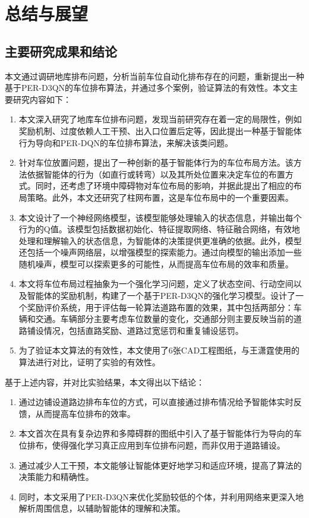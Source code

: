 \section{总结与展望}
\subsection{主要研究成果和结论}
本文通过调研地库排布问题，分析当前车位自动化排布存在的问题，重新提出一种基于PER-D3QN的车位排布算法，并通过多个案例，验证算法的有效性。本文主要研究内容如下：
\begin{enumerate}
    \item 本文深入研究了地库车位排布问题，发现当前研究存在着一定的局限性，例如奖励机制、过度依赖人工干预、出入口位置后定等，因此提出一种基于智能体行为导向和PER-DQN的车位排布算法，来解决该类问题。
    \item 针对车位放置问题，提出了一种创新的基于智能体行为的车位布局方法。该方法依据智能体的行为（如直行或转弯）以及其所处位置来决定车位的布置方式。同时，还考虑了环境中障碍物对车位布局的影响，并据此提出了相应的布局策略。此外，本文还研究了柱网布置，这是车位布局中的一个重要因素。
    \item 本文设计了一个神经网络模型，该模型能够处理输入的状态信息，并输出每个行为的Q值。该模型包括数据初始化、特征提取网络、特征融合网络，有效地处理和理解输入的状态信息，为智能体的决策提供更准确的依据。此外，模型还包括一个噪声网络层，以增强模型的探索能力。通过向模型的输出添加一些随机噪声，模型可以探索更多的可能性，从而提高车位布局的效率和质量。
    \item 本文将车位布局过程抽象为一个强化学习问题，定义了状态空间、行动空间以及智能体的奖励机制，构建了一个基于PER-D3QN的强化学习模型。设计了一个奖励评价系统，用于评估每一轮算法道路布置的效果，其中包括两部分：车辆和交通。车辆部分主要考虑车位数量的变化，交通部分则主要反映当前的道路铺设情况，包括直路奖励、道路过宽惩罚和重复铺设惩罚。
    \item 为了验证本文算法的有效性，本文使用了6张CAD工程图纸，与王潇霆使用的算法进行对比，证明了实验的有效性。
\end{enumerate}    

基于上述内容，并对比实验结果，本文得出以下结论：
\begin{enumerate}
    \item 通过边铺设道路边排布车位的方式，可以直接通过排布情况给予智能体实时反馈，从而提高车位排布的效率。
    \item 本文首次在具有复杂边界和多障碍群的图纸中引入了基于智能体行为导向的车位排布，使得强化学习真正应用到车位排布问题，而非仅用于道路铺设。
    \item 通过减少人工干预，本文能够让智能体更好地学习和适应环境，提高了算法的决策能力和精确性。
    \item 同时，本文采用了PER-D3QN来优化奖励较低的个体，并利用网络来更深入地解析周围信息，以辅助智能体的理解和决策。
\end{enumerate}
